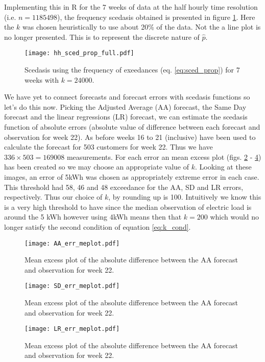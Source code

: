 \documentclass[a4paper]{article}
\begin{document}
Implementing this in R for the 7 weeks of data at the half hourly time resolution (i.e. $n = 1185498$), the frequency scedasis obtained is presented in figure \ref{fig:hh_sced_prop}. Here the $k$ was chosen heuristically to use about 20\% of the data. Not the a line plot is no longer presented. This is to represent the discrete nature of $\hat{p}$.

\begin{figure}
\centering
\texttt{[image: hh\_sced\_prop\_full.pdf]}
\caption{\label{fig:hh_sced_prop} Scedasis using the frequency of exeedances (eq. \ref{eq:sced_prop}) for 7 weeks with $k=24000$.}
\end{figure}

We have yet to connect forecasts and forecast errors with scedasis functions so let's do this now. Picking the Adjusted Average (AA) forecast, the Same Day forecast and the linear regressions (LR) forecast, we can estimate the scedasis function of absolute errors (absolute value of difference between each forecast and observation for week 22). As before weeks 16 to 21 (inclusive) have been used to calculate the forecast for 503 customers for week 22. Thus we have $336 \times 503 = 169008$ measurements. For each error an mean excess plot (figs. \ref{fig:AA_err_me} - \ref{fig:LR_err_me}) has been created so we may choose an appropriate value of $k$. Looking at these images, an error of 5kWh was chosen as appropriately extreme error in each case. This threshold had 58, 46 and 48 exceedance for the AA, SD and LR errors, respectively. Thus our choice of $k$, by rounding up is 100. Intuitively we know this is a very high threshold to have since the median observation of electric load is around the 5 kWh however using 4kWh means then that $k=200$ which would no longer satisfy the second condition of equation \ref{eq:k_cond}. 

\begin{figure}
\centering
\texttt{[image: AA\_err\_meplot.pdf]}
\caption{\label{fig:AA_err_me} Mean excess plot of the absolute difference between the AA forecast and observation for week 22.}
\end{figure}

\begin{figure}
\centering
\texttt{[image: SD\_err\_meplot.pdf]}
\caption{\label{fig:SD_err_me} Mean excess plot of the absolute difference between the AA forecast and observation for week 22.}
\end{figure}

\begin{figure}
\centering
\texttt{[image: LR\_err\_meplot.pdf]}
\caption{\label{fig:LR_err_me} Mean excess plot of the absolute difference between the AA forecast and observation for week 22.}
\end{figure}
\end{document}
